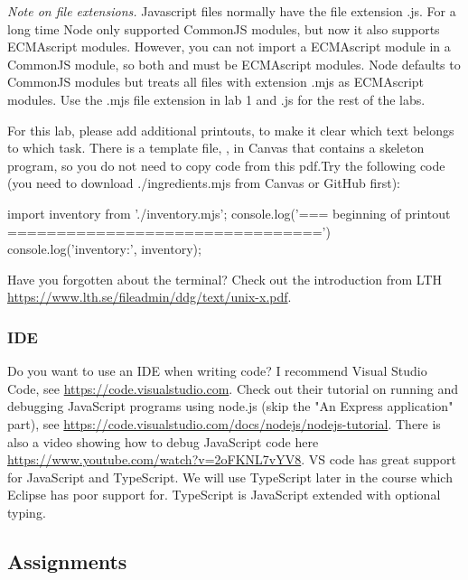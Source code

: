 \documentclass[fleqn, article, a4paper]{memoir}
\begin{document}
\noindent \emph{Note on file extensions.} Javascript files normally have the file extension .js. For a long time Node only supported CommonJS modules, but now it also supports ECMAscript modules. However, you can not import a ECMAscript module in a CommonJS module, so both  and  must be ECMAscript modules. Node defaults to CommonJS modules but treats all files with extension .mjs as ECMAscript modules. Use the .mjs file extension in lab 1 and .js for the rest of the labs.
 
For this lab, please add additional printouts, to make it clear which text belongs to which task. There is a template file, , in Canvas that contains a skeleton program, so you do not need to copy code from this pdf.Try the following code (you need to download ./ingredients.mjs from Canvas or GitHub first):
\begin{Code}
import inventory from './inventory.mjs';
console.log('\n=== beginning of printout ================================')
console.log('inventory:', inventory);
\end{Code}

\noindent Have you forgotten about the terminal? Check out the introduction from LTH \url{https://www.lth.se/fileadmin/ddg/text/unix-x.pdf}.

\subsubsection*{IDE}

\noindent Do you want to use an IDE when writing code? I recommend Visual Studio Code, see \url{https://code.visualstudio.com}. Check out their tutorial on running and debugging JavaScript programs using node.js (skip the "An Express application" part), see \url{https://code.visualstudio.com/docs/nodejs/nodejs-tutorial}. There is also a video showing how to debug JavaScript code here \url{https://www.youtube.com/watch?v=2oFKNL7vYV8}. VS code has great support for JavaScript and TypeScript. We will use TypeScript later in the course which Eclipse has poor support for. TypeScript is JavaScript extended with optional typing.

\subsection*{Assignments}
\end{document}
